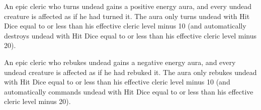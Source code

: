 An epic cleric who turns undead gains a positive energy aura, and every undead creature is affected as if he had turned it. The aura only turns undead with Hit Dice equal to or less than his effective cleric level minus 10 (and automatically destroys undead with Hit Dice equal to or less than his effective cleric level minus 20).

An epic cleric who rebukes undead gains a negative energy aura, and every undead creature is affected as if he had rebuked it. The aura only rebukes undead with Hit Dice equal to or less than his effective cleric level minus 10 (and automatically commands undead with Hit Dice equal to or less than his effective cleric level minus 20).
